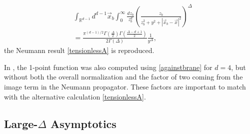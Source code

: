 \documentclass[reprint,amsmath,amssymb,aps,nofootinbib,twocolumn]{revtex4-2}
\begin{document}
\begin{appendix}
\begin{equation}
\begin{split}
&\int_{\mathbb{R}^{d-1}} d^{d-1} \vec{x}_b \int_0^\infty \frac{dz_b}{z_b^d} \left(\frac{z_b}{z_b^2 + y^2 + |\vec{x}_b - \vec{x}|^2}\right)^\Delta\\
&= \frac{\pi^{(d-1)/2}\Gamma\left(\frac{\Delta}{2}\right)\Gamma\left(\frac{\Delta - d + 1}{2}\right)}{2\Gamma(\Delta)}\frac{1}{y^\Delta},
\end{split}
\end{equation}
the Neumann result \eqref{tensionlessA} is reproduced.

In \cite{DeWolfe:2001pq}, the 1-point function was also computed using \eqref{againstbrane} for $ d=4 $, but without both the overall normalization and the factor of two coming from the image term in the Neumann propagator. These factors are important to match with the alternative calculation \eqref{tensionlessA}.

\subsection{Large-$ \Delta $ Asymptotics}


\end{appendix}
\end{document}
